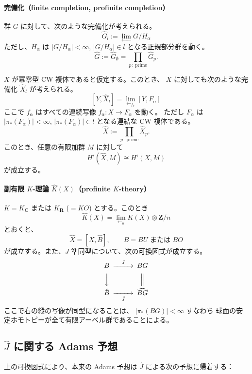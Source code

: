 \documentclass[uplatex,dvipdfmx,a4paper,12pt]{jlreq}
\newcommand{\Z}{\mathbf{Z}}
\newcommand{\R}{\mathbf{R}}
\newcommand{\C}{\mathbf{C}}
\begin{document}
\paragraph{完備化（finite completion, profinite completion）}

群 $G$ に対して、次のような完備化が考えられる。
\[
  \hat{G}_l := \lim_{\longleftarrow} G/H_\alpha
\]
ただし、$H_\alpha$ は $|G/H_\alpha| < \infty$,
$|G/H_\alpha| \in l$ となる正規部分群を動く。
\[
  \hat{G} := \hat{G}_\emptyset = \prod_{p\,:\,\text{prime}} \hat{G}_p.
\]

$X$ が冪零型 CW 複体であると仮定する。このとき、
$X$ に対しても次のような完備化 $\hat{X}_l$ が考えられる。
\[
  [Y, \hat{X}_l] = \lim_{\longleftarrow_{f_\alpha}} [Y, F_\alpha]
\]
ここで $f_\alpha$ はすべての連続写像 $f_\alpha : X \to F_\alpha$ を動く。
ただし $F_\alpha$ は $|\pi_*(F_\alpha)| < \infty$,
$|\pi_*(F_\alpha)| \in l$ となる連結な CW 複体である。
\[
  \hat{X} := \prod_{p\,:\,\text{prime}} \hat{X}_p.
\]
このとき、任意の有限加群 $M$ に対して
\[
  H^i(\hat{X}, M) \cong H^i(X, M)
\]
が成立する。

\paragraph{副有限 $K$-理論 $\hat{K}(X)$（profinite $K$-theory）}

$K = K_\C$ または $K_\R$ ($= KO$) とする。このとき
\[
  \hat{K}(X) = \lim_{\longleftarrow_n} K(X) \otimes \Z/n
\]
とおくと、
\[
  \hat{X} = [X, \hat{B}], \qquad B = BU \text{ または } BO
\]
が成立する。また、$J$ 準同型について、次の可換図式が成立する。
\[
  \begin{CD}
    B      @>{J}>>    BG \\
    @VVV              @| \\
    \hat{B} @>>{\hat{J}}> \widehat{BG}
  \end{CD}
\]
ここで右の縦の写像が同型になることは、
$|\pi_*(BG)| < \infty$ すなわち
球面の安定ホモトピーが全て有限アーベル群であることによる。

\subsection{$\hat{J}$ に関する Adams 予想}

上の可換図式により、本来の Adams 予想は $\hat{J}$ による次の予想に帰着する：
\end{document}
